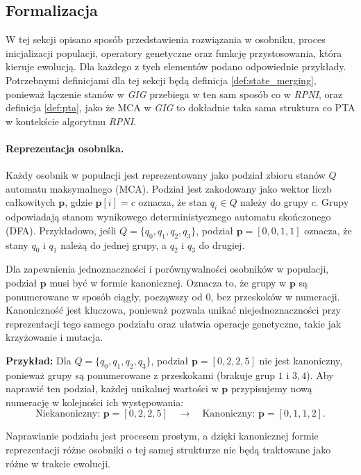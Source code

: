 \subsection{Formalizacja}
\label{sec:gig-formalizacja}

W tej sekcji opisano sposób przedstawienia rozwiązania w osobniku, proces inicjalizacji populacji, operatory genetyczne oraz funkcję przystosowania, która kieruje ewolucją. Dla każdego z tych elementów podano odpowiednie przykłady. Potrzebnymi definicjami dla tej sekcji będą definicja \ref{def:state_merging}, ponieważ łączenie stanów w \textit{GIG} przebiega w ten sam sposób co w \textit{RPNI}, oraz definicja \ref{def:pta}, jako że MCA w \textit{GIG} to dokładnie taka sama struktura co PTA w kontekście algorytmu \textit{RPNI}.

\paragraph*{Reprezentacja osobnika.}  
Każdy osobnik w populacji jest reprezentowany jako podział zbioru stanów \( Q \) automatu maksymalnego (MCA). Podział jest zakodowany jako wektor liczb całkowitych \( \mathbf{p} \), gdzie \( \mathbf{p}[i] = c \) oznacza, że stan \( q_i \in Q \) należy do grupy \( c \). Grupy odpowiadają stanom wynikowego deterministycznego automatu skończonego (DFA). Przykładowo, jeśli \( Q = \{q_0, q_1, q_2, q_3\} \), podział \( \mathbf{p} = [0, 0, 1, 1] \) oznacza, że stany \( q_0 \) i \( q_1 \) należą do jednej grupy, a \( q_2 \) i \( q_3 \) do drugiej.

Dla zapewnienia jednoznaczności i porównywalności osobników w populacji, podział \( \mathbf{p} \) musi być w formie kanonicznej. Oznacza to, że grupy w \( \mathbf{p} \) są ponumerowane w sposób ciągły, począwszy od \( 0 \), bez przeskoków w numeracji. Kanoniczność jest kluczowa, ponieważ pozwala unikać niejednoznaczności przy reprezentacji tego samego podziału oraz ułatwia operacje genetyczne, takie jak krzyżowanie i mutacja.

\textbf{Przykład:}  
Dla \( Q = \{q_0, q_1, q_2, q_3\} \), podział \( \mathbf{p} = [0, 2, 2, 5] \) nie jest kanoniczny, ponieważ grupy są ponumerowane z przeskokami (brakuje grup \( 1 \) i \( 3, 4 \)). Aby naprawić ten podział, każdej unikalnej wartości w \( \mathbf{p} \) przypisujemy nową numerację w kolejności ich występowania:
\[
\text{Niekanoniczny: } \mathbf{p} = [0, 2, 2, 5] \quad \rightarrow \quad \text{Kanoniczny: } \mathbf{p} = [0, 1, 1, 2].
\]

Naprawianie podziału jest procesem prostym, a dzięki kanonicznej formie reprezentacji różne osobniki o tej samej strukturze nie będą traktowane jako różne w trakcie ewolucji.

